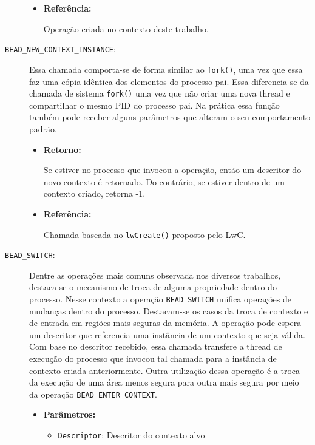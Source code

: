 \begin{description}
\begin{itemize}
    \item \textbf{Referência:}

Operação criada no contexto deste trabalho.

	\end{itemize}

  \item [\texttt{BEAD\_NEW\_CONTEXT\_INSTANCE}:]

Essa chamada comporta-se de forma similar ao \texttt{fork()}, uma vez que essa
faz uma cópia idêntica dos elementos do processo pai. Essa diferencia-se da
chamada de sistema \texttt{fork()} uma vez que não criar uma nova thread e
compartilhar o mesmo PID do processo pai. Na prática essa função também pode
receber alguns parâmetros que alteram o seu comportamento padrão.

  \begin{itemize}
    \item \textbf{Retorno:}

Se estiver no processo que invocou a operação, então um descritor do novo
contexto é retornado. Do contrário, se estiver dentro de um contexto criado,
retorna -1.

    \item \textbf{Referência:}

Chamada baseada no \texttt{lwCreate()} proposto pelo LwC.

  \end{itemize}

  \item [\texttt{BEAD\_SWITCH}:]

Dentre as operações mais comuns observada nos diversos trabalhos, destaca-se o
mecanismo de troca de alguma propriedade dentro do processo. Nesse contexto a
operação \texttt{BEAD\_SWITCH} unifica operações de mudanças dentro do
processo. Destacam-se os casos da troca de contexto e de entrada em regiões
mais seguras da memória. A operação pode espera um descritor que referencia uma
instância de um contexto que seja válida. Com base no descritor recebido, essa
chamada transfere a thread de execução do processo que invocou tal chamada para
a instância de contexto criada anteriormente. Outra utilização dessa operação é
a troca da execução de uma área menos segura para outra mais segura por meio da
operação \texttt{BEAD\_ENTER\_CONTEXT}.

  \begin{itemize}
    \item \textbf{Parâmetros:}

    \begin{itemize}
      \item \texttt{Descriptor}: Descritor do contexto alvo
    \end{itemize}


\end{itemize}
\end{description}
